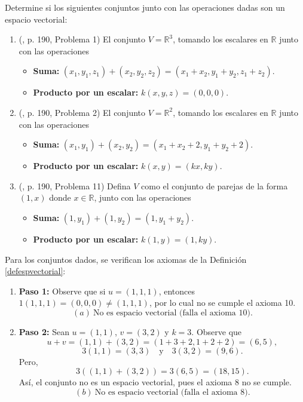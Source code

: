 \begin{example}
Determine si los siguientes conjuntos junto con las operaciones dadas son un espacio vectorial:

\begin{enumerate}[$(a)$]
\item (\cite{anton2014elementary}, p. 190, Problema 1) El conjunto $V=\mathbb{R}^3$, tomando los escalares en $\mathbb{R}$ junto con las operaciones 
\begin{itemize}
\item \textbf{Suma:} $(x_1,y_1,z_1)+(x_2,y_2,z_2)=(x_1+x_2,y_1+y_2,z_1+z_2)$.
\item \textbf{Producto por un escalar:} $k(x,y,z)=(0,0,0)$.
\end{itemize}    

\item (\cite{anton2014elementary}, p. 190, Problema 2) El conjunto $V=\mathbb{R}^2$, tomando los escalares en $\mathbb{R}$ junto con las operaciones
\begin{itemize}
\item \textbf{Suma:} $(x_1,y_1)+(x_2,y_2)=(x_1+x_2+2,y_1+y_2+2)$.
\item \textbf{Producto por un escalar:} $k(x,y)=(kx,ky)$.
\end{itemize}            

\item (\cite{anton2014elementary}, p. 190, Problema 11) Defina $V$ como el conjunto de parejas de la forma $(1,x)$ donde $x \in \mathbb{R}$, junto con las operaciones
\begin{itemize}
\item \textbf{Suma:} $(1,y_1)+(1,y_2)=(1,y_1+y_2)$.
\item \textbf{Producto por un escalar:} $k(1,y)=(1,ky)$.
\end{itemize}          
\end{enumerate}

\begin{myproof}
Para los conjuntos dados, se verifican los axiomas de la Definición \ref{defespvectorial}:

\begin{enumerate}[$(a)$]
\item \textbf{Paso 1:} Observe que si $u=(1,1,1)$, entonces $1(1,1,1)=(0,0,0)\neq (1,1,1)$, por lo cual no se cumple el axioma 10.
$$\boxed{(a)\ \text{No es espacio vectorial (falla el axioma 10).}}$$

\item \textbf{Paso 2:} Sean $u=(1,1)$, $v=(3,2)$ y $k=3$. Observe que
$$u+v=(1,1)+(3,2)=(1+3+2,1+2+2)=(6,5),$$
$$3(1,1)=(3,3) \quad \text{y} \quad 3(3,2)=(9,6).$$
Pero,
$$3((1,1)+(3,2))=3(6,5)=(18,15).$$
Así, el conjunto no es un espacio vectorial, pues el axioma 8 no se cumple.
$$\boxed{(b)\ \text{No es espacio vectorial (falla el axioma 8).}}$$


\end{enumerate}
\end{myproof}
\end{example}
